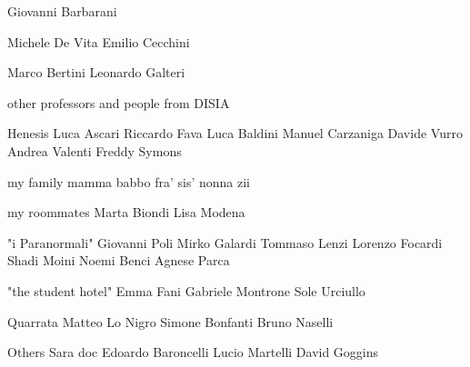 \label{chap:Acknowledgement}

Giovanni Barbarani

Michele De Vita
Emilio Cecchini

Marco Bertini
Leonardo Galteri

other professors and people from DISIA

Henesis
Luca Ascari
Riccardo Fava
Luca Baldini
Manuel Carzaniga
Davide Vurro
Andrea Valenti
Freddy Symons

my family
mamma
babbo
fra'
sis'
nonna
zii

my roommates
Marta Biondi
Lisa Modena

"i Paranormali"
Giovanni Poli
Mirko Galardi
Tommaso Lenzi
Lorenzo Focardi
Shadi Moini
Noemi Benci
Agnese Parca

"the student hotel"
Emma Fani
Gabriele Montrone
Sole Urciullo

Quarrata
Matteo Lo Nigro
Simone Bonfanti
Bruno Naselli

Others
Sara doc
Edoardo Baroncelli
Lucio Martelli
David Goggins
